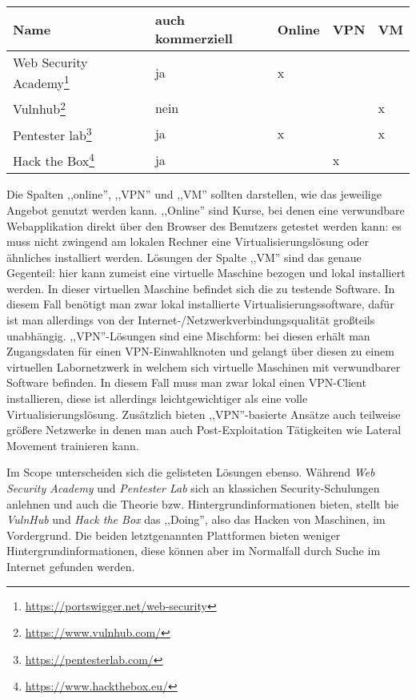 \begin{table}[h!]
	\begin{center}
\begin{tabular}{|l|l|lll|}
	\toprule
	Name & auch kommerziell & Online & VPN & VM \\
	\midrule
	Web Security Academy\footnote{\url{https://portswigger.net/web-security}}  & ja   & x &   &   \\
	Vulnhub\footnote{\url{https://www.vulnhub.com/}}              & nein &   &   & x \\
	Pentester lab\footnote{\url{https://pentesterlab.com/}}        & ja   & x &   & x \\
	Hack the Box\footnote{\url{https://www.hackthebox.eu/}}         & ja   & ~ & x &   \\
	\bottomrule
\end{tabular}
\end{center}
\end{table}

Die Spalten ,,online'', ,,VPN'' und ,,VM'' sollten darstellen, wie das jeweilige Angebot genutzt werden kann. ,,Online'' sind Kurse, bei denen eine verwundbare Webapplikation direkt über den Browser des Benutzers getestet werden kann: es muss nicht zwingend am lokalen Rechner eine Virtualisierungslösung oder ähnliches installiert werden. Lösungen der Spalte ,,VM'' sind das genaue Gegenteil: hier kann zumeist eine virtuelle Maschine bezogen und lokal installiert werden. In dieser virtuellen Maschine befindet sich die zu testende Software. In diesem Fall benötigt man zwar lokal installierte Virtualisierungssoftware, dafür ist man allerdings von der Internet-/Netzwerkverbindungsqualität großteils unabhängig. ,,VPN''-Lösungen sind eine Mischform: bei diesen erhält man Zugangsdaten für einen VPN-Einwahlknoten und gelangt über diesen zu einem virtuellen Labornetzwerk in welchem sich virtuelle Maschinen mit verwundbarer Software befinden. In diesem Fall muss man zwar lokal einen VPN-Client installieren, diese ist allerdings leichtgewichtiger als eine volle Virtualisierungslösung. Zusätzlich bieten ,,VPN''-basierte Ansätze auch teilweise größere Netzwerke in denen man auch Post-Exploitation Tätigkeiten wie Lateral Movement trainieren kann.

Im Scope unterscheiden sich die gelisteten Lösungen ebenso. Während \textit{Web Security Academy} und \textit{Pentester Lab} sich an klassichen Security-Schulungen anlehnen und auch die Theorie bzw. Hintergrundinformationen bieten, stellt bie \textit{VulnHub} und \textit{Hack the Box} das ,,Doing'', also das Hacken von Maschinen, im Vordergrund. Die beiden letztgenannten Plattformen bieten weniger Hintergrundinformationen, diese können aber im Normalfall durch Suche im Internet gefunden werden.


